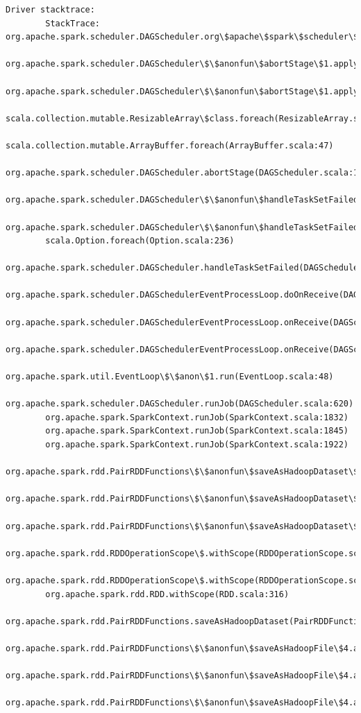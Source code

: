 \documentclass[11pt]{article}
\begin{document}
\begin{Verbatim}[commandchars=\\\{\}]
        Driver stacktrace:
        StackTrace: org.apache.spark.scheduler.DAGScheduler.org\$apache\$spark\$scheduler\$DAGScheduler\$\$failJobAndIndependentStages(DAGScheduler.scala:1431)
        org.apache.spark.scheduler.DAGScheduler\$\$anonfun\$abortStage\$1.apply(DAGScheduler.scala:1419)
        org.apache.spark.scheduler.DAGScheduler\$\$anonfun\$abortStage\$1.apply(DAGScheduler.scala:1418)
        scala.collection.mutable.ResizableArray\$class.foreach(ResizableArray.scala:59)
        scala.collection.mutable.ArrayBuffer.foreach(ArrayBuffer.scala:47)
        org.apache.spark.scheduler.DAGScheduler.abortStage(DAGScheduler.scala:1418)
        org.apache.spark.scheduler.DAGScheduler\$\$anonfun\$handleTaskSetFailed\$1.apply(DAGScheduler.scala:799)
        org.apache.spark.scheduler.DAGScheduler\$\$anonfun\$handleTaskSetFailed\$1.apply(DAGScheduler.scala:799)
        scala.Option.foreach(Option.scala:236)
        org.apache.spark.scheduler.DAGScheduler.handleTaskSetFailed(DAGScheduler.scala:799)
        org.apache.spark.scheduler.DAGSchedulerEventProcessLoop.doOnReceive(DAGScheduler.scala:1640)
        org.apache.spark.scheduler.DAGSchedulerEventProcessLoop.onReceive(DAGScheduler.scala:1599)
        org.apache.spark.scheduler.DAGSchedulerEventProcessLoop.onReceive(DAGScheduler.scala:1588)
        org.apache.spark.util.EventLoop\$\$anon\$1.run(EventLoop.scala:48)
        org.apache.spark.scheduler.DAGScheduler.runJob(DAGScheduler.scala:620)
        org.apache.spark.SparkContext.runJob(SparkContext.scala:1832)
        org.apache.spark.SparkContext.runJob(SparkContext.scala:1845)
        org.apache.spark.SparkContext.runJob(SparkContext.scala:1922)
        org.apache.spark.rdd.PairRDDFunctions\$\$anonfun\$saveAsHadoopDataset\$1.apply\$mcV\$sp(PairRDDFunctions.scala:1209)
        org.apache.spark.rdd.PairRDDFunctions\$\$anonfun\$saveAsHadoopDataset\$1.apply(PairRDDFunctions.scala:1154)
        org.apache.spark.rdd.PairRDDFunctions\$\$anonfun\$saveAsHadoopDataset\$1.apply(PairRDDFunctions.scala:1154)
        org.apache.spark.rdd.RDDOperationScope\$.withScope(RDDOperationScope.scala:150)
        org.apache.spark.rdd.RDDOperationScope\$.withScope(RDDOperationScope.scala:111)
        org.apache.spark.rdd.RDD.withScope(RDD.scala:316)
        org.apache.spark.rdd.PairRDDFunctions.saveAsHadoopDataset(PairRDDFunctions.scala:1154)
        org.apache.spark.rdd.PairRDDFunctions\$\$anonfun\$saveAsHadoopFile\$4.apply\$mcV\$sp(PairRDDFunctions.scala:1060)
        org.apache.spark.rdd.PairRDDFunctions\$\$anonfun\$saveAsHadoopFile\$4.apply(PairRDDFunctions.scala:1026)
        org.apache.spark.rdd.PairRDDFunctions\$\$anonfun\$saveAsHadoopFile\$4.apply(PairRDDFunctions.scala:1026)

\end{Verbatim}
\end{document}
